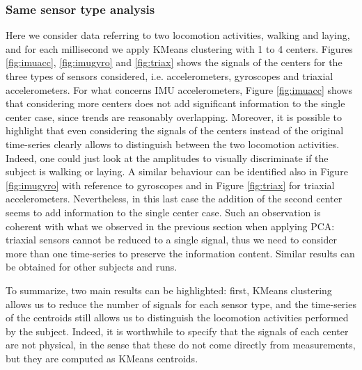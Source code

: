 \documentclass[10pt, a4paper, twocolumn]{article}
\theoremstyle{definition}
\begin{document}
\subsubsection{Same sensor type analysis}
Here we consider data referring to two locomotion activities, walking and laying, and for each millisecond we apply KMeans clustering with 1 to 4 centers. Figures \ref{fig:imuacc}, \ref{fig:imugyro} and \ref{fig:triax} shows the signals of the centers for the three types of sensors considered, i.e. accelerometers, gyroscopes and triaxial accelerometers. For what concerns IMU accelerometers, Figure \ref{fig:imuacc} shows that considering more centers does not add significant information to the single center case, since trends are reasonably overlapping. Moreover, it is possible to highlight that even considering the signals of the centers instead of the original time-series clearly allows to distinguish between the two locomotion activities. Indeed, one could just look at the amplitudes to visually discriminate if the subject is walking or laying. A similar behaviour can be identified also in Figure \ref{fig:imugyro} with reference to gyroscopes and in Figure \ref{fig:triax}
for triaxial accelerometers. Nevertheless, in this last case the addition of the second center seems to add information to the single center case. Such an observation is coherent with what we observed in the previous section when applying PCA: triaxial sensors cannot be reduced to a single signal, thus we need to consider more than one time-series to preserve the information content. Similar results can be obtained for other subjects and runs.
\par
To summarize, two main results can be highlighted: first, KMeans clustering allows us to reduce the number of signals for each sensor type, and the time-series of the centroids still allows us to distinguish the locomotion activities performed by the subject. Indeed, it is worthwhile to specify that the signals of each center are not physical, in the sense that these do not come directly from measurements, but they are computed as KMeans centroids.
\end{document}
